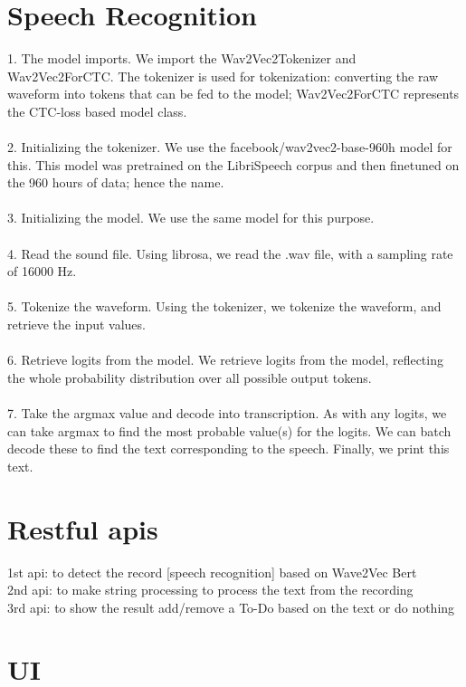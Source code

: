 \documentclass[fleqn,10pt]{SelfArx} %
\begin{document}
\section{Speech Recognition}
1. The model imports. We import the Wav2Vec2Tokenizer and Wav2Vec2ForCTC. The tokenizer is used for tokenization: converting the raw waveform into tokens that can be fed to the model; Wav2Vec2ForCTC represents the CTC-loss based model class.\\\\
2. Initializing the tokenizer. We use the facebook/wav2vec2-base-960h model for this. This model was pretrained on the LibriSpeech corpus and then finetuned on the 960 hours of data; hence the name.\\\\
3. Initializing the model. We use the same model for this purpose.\\\\
4. Read the sound file. Using librosa, we read the .wav file, with a sampling rate of 16000 Hz.\\\\
5. Tokenize the waveform. Using the tokenizer, we tokenize the waveform, and retrieve the input values.\\\\
6. Retrieve logits from the model. We retrieve logits from the model, reflecting the whole probability distribution over all possible output tokens.\\\\
7. Take the argmax value and decode into transcription. As with any logits, we can take argmax to find the most probable value(s) for the logits. We can batch decode these to find the text corresponding to the speech. Finally, we print this text.


\section{Restful apis}

1st api: to detect the record [speech recognition] based on Wave2Vec Bert \\
2nd api: to make string processing to process the text from the recording  \\
3rd api: to show the result add/remove a To-Do based on the text or do nothing

\section{UI}
\end{document}
